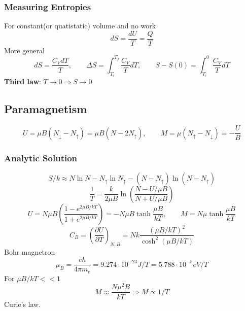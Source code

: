 \documentclass[a4paper,norsk, 10pt]{article}
\begin{document}
\subsubsection{Measuring Entropies}
For constant(or quatistatic) volume and no work
\begin{equation}
dS = \frac{dU}{T} = \frac{Q}{T}
\end{equation}
More general
\begin{equation}
dS = \frac{C_V dT}{T},\qquad \Delta S = \int_{T_i}^{T_f}\frac{C_V}{T}dT,\qquad S - S(0) = \int_{T_i}^{0}\frac{C_V}{T}dT
\end{equation}
\textbf{Third law}: $T\rightarrow 0 \Rightarrow S\rightarrow0$
\subsection{Paramagnetism}
\begin{equation}
U = \mu B(N_\downarrow - N_\uparrow) = \mu B (N- 2N_\uparrow),\qquad M = \mu(N_\uparrow - N_\downarrow) = -\frac{U}{B}
\end{equation}
\subsubsection{Analytic Solution}
\begin{equation}
S/k \approx N\ln N - N_\uparrow \ln N_\uparrow - (N-N_\uparrow)\ln(N-N_\uparrow)
\end{equation}
\begin{equation}
\frac{1}{T} = \frac{k}{2\mu B}\ln\left(\frac{N- U/\mu B}{N+ U/\mu B}\right)
\end{equation}
\begin{equation}
U = N\mu B\left(\frac{1-e^{2\mu B/kT}}{1+e^{2\mu B/kT}}\right) = -N\mu B\tanh\frac{\mu B}{kT},\qquad M = N\mu \tanh\frac{\mu B}{kT}
\end{equation}
\begin{equation}
C_B = \left(\frac{\partial U}{\partial T}\right)_{N,B} = Nk \frac{(\mu B/kT)^2}{\cosh^2(\mu B/kT	)}
\end{equation}
Bohr magnetron
\begin{equation}
\mu_B = \frac{eh}{4\pi m_e} = 9.274\cdot10^{-24} J/T = 5.788\cdot10^{-5}eV/T
\end{equation}
For $\mu B/kT << 1$
\begin{equation}
M\approx \frac{N\mu^2B}{kT} \Rightarrow M \propto 1/T
\end{equation}
Curie's law.
\end{document}
